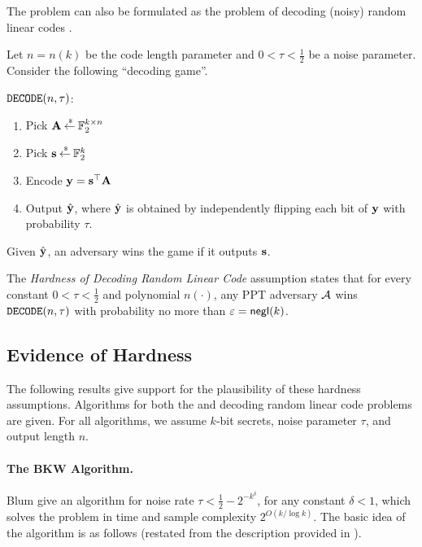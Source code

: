 The \LPN problem can also be formulated as the problem of decoding (noisy) random linear codes \cite{applebaum2008fast}.
\begin{definition}
	Let $n = n(k)$ be the code length parameter and $0 < \tau < \frac{1}{2}$ be a noise parameter.
	Consider the following ``decoding game''.
	\begin{boxedalgo}
		$\mathtt{DECODE}(n,\tau)$:
		\vspace*{-8pt}
		\begin{enumerate}
			\itemsep-2pt
			\item Pick ${\mathbf A} \mathbin{\stackrel{\mbox{\,\tiny \$}}{\gets}} {\mathbb F}_2^{k\times n}$
			\item Pick ${\mathbf s} \mathbin{\stackrel{\mbox{\,\tiny \$}}{\gets}} {\mathbb F}_2^{k}$
			\item Encode ${\mathbf y} = {\mathbf s}^\top{\mathbf A}$
			\item Output $\hat{{\mathbf y}}$, where $\hat{{\mathbf y}}$ is obtained by independently flipping each bit of ${\mathbf y}$ with probability $\tau$.
		\end{enumerate}
	Given $\hat{{\mathbf y}}$, an adversary \cA wins the game if it outputs ${\mathbf s}$.
	\end{boxedalgo}

	The {\em Hardness of Decoding Random Linear Code} assumption states that for every constant $0 < \tau < \frac{1}{2}$ and polynomial $n(\cdot)$, any PPT adversary ${\mathcal A}$ wins $\mathtt{DECODE}(n,\tau)$ with probability no more than $\varepsilon = \mathsf{negl}(k)$. 
\end{definition}

\subsection{Evidence of Hardness}\label{sec:hardness}

The following results give support for the plausibility of these hardness assumptions.
Algorithms for both the \LPN and decoding random linear code problems are given.
For all algorithms, we assume $k$-bit secrets, noise parameter $\tau$, and output length $n$.


\paragraph{The BKW Algorithm.} Blum \etal \cite{STOC:BluKalWas00} give an algorithm for noise rate $\tau < \frac{1}{2} - 2^{-k^\delta}$, for any constant $\delta < 1$, which solves the \LPN problem in time and sample complexity $2^{O(k/\log k)}$.
The basic idea of the algorithm is as follows (restated from the description provided in \cite[Section 2]{Levieil06}).

